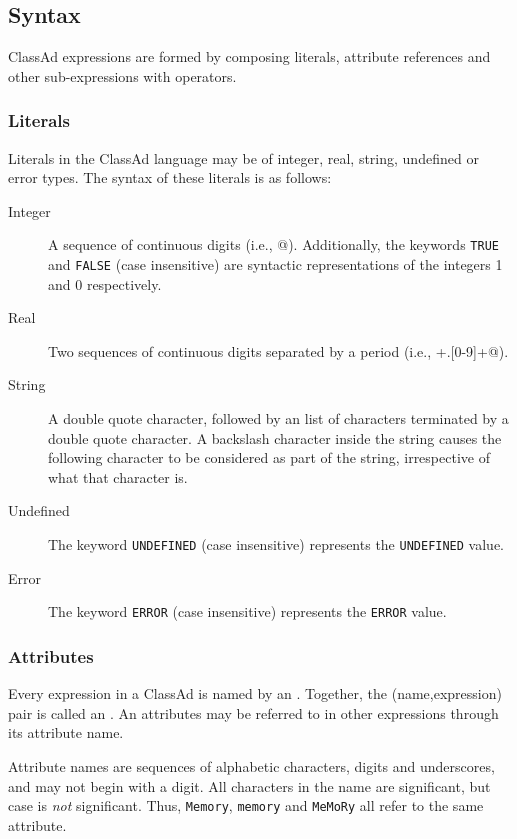 \subsection{Syntax}
ClassAd expressions are formed by composing literals, attribute references and 
other sub-expressions with operators. 
\subsubsection{Literals}
Literals in the ClassAd language may be of integer, real, string, undefined or 
error types.  The syntax of these literals is as follows:
\begin{description}
	\item[Integer]  A sequence of continuous digits (i.e., \verb@[0-9]@).
		Additionally, the keywords \verb+TRUE+ and \verb+FALSE+ (case
		insensitive) are syntactic representations of the integers 1 and 0 
		respectively.

	\item[Real] Two sequences of continuous digits separated by a period
		(i.e., \verb@[0-9]+.[0-9]+@).

	\item[String] A double quote character, followed by an list of characters
		terminated by a double quote character.  A backslash character inside
		the string causes the following character to be considered as part of
		the string, irrespective of what that character is.

	\item[Undefined] The keyword \texttt{UNDEFINED} (case insensitive)
		represents the \texttt{UNDEFINED} value.

	\item[Error] The keyword \texttt{ERROR} (case insensitive)
		represents the \texttt{ERROR} value.
\end{description}

\subsubsection{Attributes}
Every expression in a ClassAd is named by an .  Together,
the (name,expression) pair is called an .  An attributes may be
referred to in other expressions through its attribute name.

Attribute names are sequences of alphabetic characters, digits and underscores,
and may not begin with a digit.  All characters in the name are significant,
but case is \emph{not} significant.  Thus, \verb+Memory+, \verb+memory+ and 
\verb+MeMoRy+ all refer to the same attribute.

